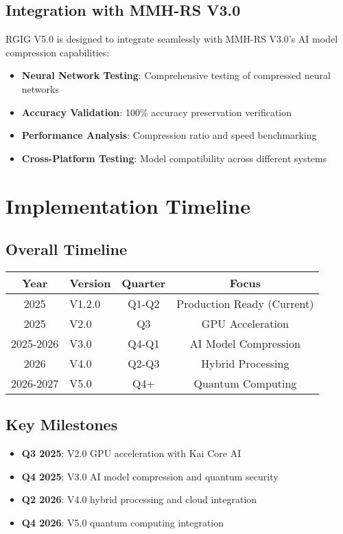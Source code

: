 \documentclass[12pt,a4paper]{article}
\begin{document}
\subsection{Integration with MMH-RS V3.0}
RGIG V5.0 is designed to integrate seamlessly with MMH-RS V3.0's AI model compression capabilities:

\begin{itemize}
    \item \textbf{Neural Network Testing}: Comprehensive testing of compressed neural networks
    \item \textbf{Accuracy Validation}: 100\% accuracy preservation verification
    \item \textbf{Performance Analysis}: Compression ratio and speed benchmarking
    \item \textbf{Cross-Platform Testing}: Model compatibility across different systems
\end{itemize}

\newpage

\section{Implementation Timeline}

\subsection{Overall Timeline}
\begin{center}
\begin{tabular}{|c|l|c|c|}
\hline
\textbf{Year} & \textbf{Version} & \textbf{Quarter} & \textbf{Focus} \\
\hline
2025 & V1.2.0 & Q1-Q2 & Production Ready (Current) \\
2025 & V2.0 & Q3 & GPU Acceleration \\
2025-2026 & V3.0 & Q4-Q1 & AI Model Compression \\
2026 & V4.0 & Q2-Q3 & Hybrid Processing \\
2026-2027 & V5.0 & Q4+ & Quantum Computing \\
\hline
\end{tabular}
\end{center}

\subsection{Key Milestones}
\begin{itemize}
    \item \textbf{Q3 2025}: V2.0 GPU acceleration with Kai Core AI
    \item \textbf{Q4 2025}: V3.0 AI model compression and quantum security
    \item \textbf{Q2 2026}: V4.0 hybrid processing and cloud integration
    \item \textbf{Q4 2026}: V5.0 quantum computing integration
\end{itemize}
\end{document}
